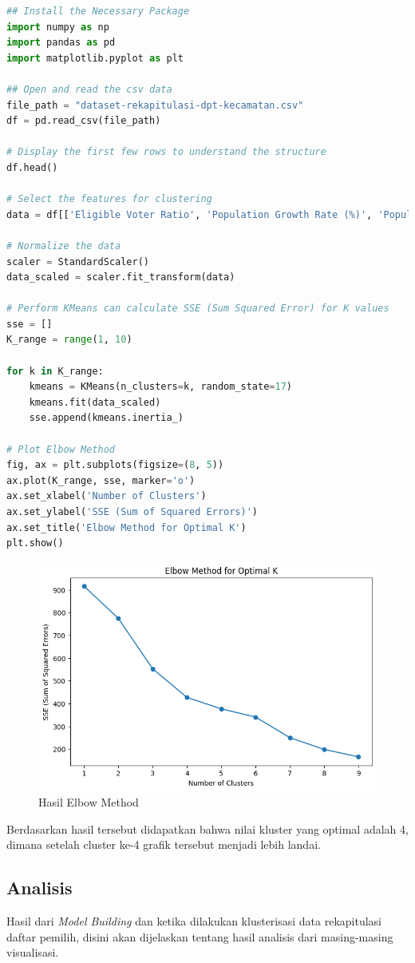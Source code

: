 \begin{lstlisting}[language=Python, caption=Python Code for Elbow Methods,label={lst:elbow_method}]
## Install the Necessary Package
import numpy as np
import pandas as pd
import matplotlib.pyplot as plt

## Open and read the csv data
file_path = "dataset-rekapitulasi-dpt-kecamatan.csv"
df = pd.read_csv(file_path)

# Display the first few rows to understand the structure
df.head()

# Select the features for clustering
data = df[['Eligible Voter Ratio', 'Population Growth Rate (%)', 'Population Density', 'Voter Gender Ratio']]

# Normalize the data
scaler = StandardScaler()
data_scaled = scaler.fit_transform(data)

# Perform KMeans can calculate SSE (Sum Squared Error) for K values
sse = []
K_range = range(1, 10)

for k in K_range:
    kmeans = KMeans(n_clusters=k, random_state=17)
    kmeans.fit(data_scaled)
    sse.append(kmeans.inertia_)

# Plot Elbow Method
fig, ax = plt.subplots(figsize=(8, 5))
ax.plot(K_range, sse, marker='o')
ax.set_xlabel('Number of Clusters')
ax.set_ylabel('SSE (Sum of Squared Errors)')
ax.set_title('Elbow Method for Optimal K')
plt.show()
\end{lstlisting}

\begin{figure}[h]
    \centering
    \includegraphics[width=0.5\linewidth]{images/optimum_cluster.png}
    \caption{Hasil Elbow Method}
    \label{fig:elbow_method}
\end{figure}

Berdasarkan hasil tersebut didapatkan bahwa nilai kluster yang optimal adalah 4, dimana setelah cluster ke-4 grafik tersebut menjadi lebih landai.

\subsection{Analisis}
Hasil dari \textit{Model Building} dan ketika dilakukan klusterisasi data rekapitulasi daftar pemilih, disini akan dijelaskan tentang hasil analisis dari masing-masing visualisasi.

